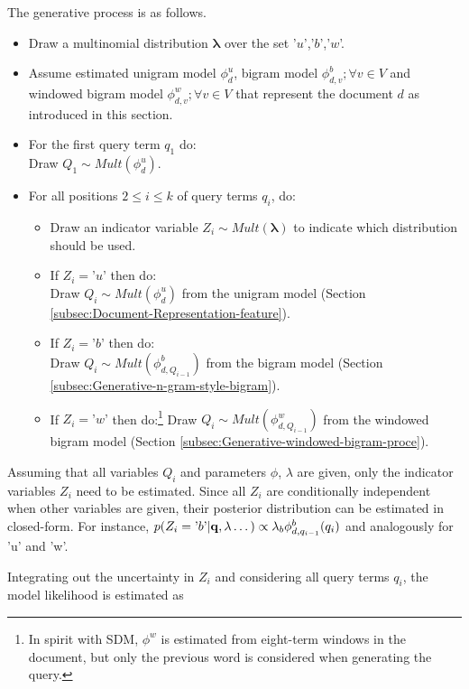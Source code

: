 \documentclass[]{article}
\begin{document}
The generative process is as follows.
\begin{itemize}[leftmargin=3mm]
\item Draw a multinomial distribution $\boldsymbol{\lambda}$ over the set
'$u$','$b$','$w$'.
\item Assume estimated unigram model $\phi_{d}^{u}$, bigram model $\phi_{d,v}^{b};\forall v\in V$
and windowed bigram model $\phi_{d,v}^{w};\forall v\in V$ that represent
the document $d$ as introduced in this section.
\item For the first query term $q_{1}$ do: \\
Draw $Q_{1}\sim Mult(\phi_{d}^{u})$.
\item For all positions $2\leq i\leq k$ of query terms $q_{i}$, do:

\begin{itemize}[leftmargin=3mm]
\item Draw an indicator variable $Z_{i}\sim Mult(\boldsymbol{\lambda})$
to indicate which distribution should be used.
\item If $Z_{i}=\mbox{'}u\mbox{'}$ then do: \\
Draw $Q_{i}\sim Mult(\phi_{d}^{u})$
from the unigram model (Section \ref{subsec:Document-Representation-feature}).
\item If $Z_{i}=\mbox{'}b\mbox{'}$ then do: \\
Draw $Q_{i}\sim Mult(\phi_{d,Q_{i-1}}^{b})$
from the bigram model (Section \ref{subsec:Generative-n-gram-style-bigram}).
\item If $Z_{i}=\mbox{'}w\mbox{'}$ then do:\footnote{In spirit with SDM, $\phi^{w}$ is estimated from eight-term windows
in the document, but only the previous word is considered when generating
the query.} Draw $Q_{i}\sim Mult(\phi_{d,Q_{i-1}}^{w})$ from the windowed bigram
model (Section \ref{subsec:Generative-windowed-bigram-proce}).
\end{itemize}
\end{itemize}
Assuming that all variables $Q_{i}$ and parameters $\phi$, $\lambda$
are given, only the indicator variables $Z_{i}$ need to be estimated.
Since all $Z_{i}$ are conditionally independent when other variables
are given, their posterior distribution can be estimated in closed-form.
For instance, $p(Z_{i}=\mbox{'}b\mbox{'}|\mathbf{q},\mbox{\ensuremath{\lambda}}\dots)\propto\lambda_{b}\phi_{d,q_{i-1}}^{b}(q_{i})$
and analogously for 'u' and 'w'.

Integrating out the uncertainty in $Z_{i}$ and considering all query
terms $q_{i}$, the model likelihood is estimated as
\end{document}
